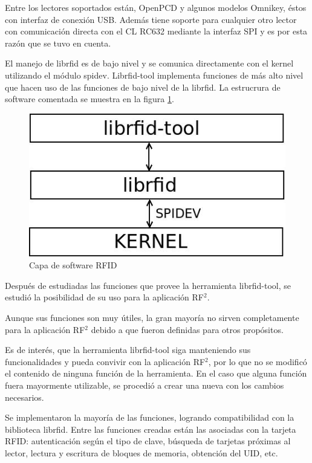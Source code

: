 \documentclass[%
        final,
        notitlepage,
        narroweqnarray,
        inline,
        ]{ieee}
\begin{document}
Entre los lectores soportados están, OpenPCD y algunos modelos Omnikey, éstos con interfaz de conexión USB. Además tiene soporte para cualquier otro lector con comunicación directa con el CL RC632 mediante la interfaz SPI y es por esta razón que se tuvo en cuenta.

El manejo de librfid es de bajo nivel y se comunica directamente con el kernel utilizando el módulo spidev. Librfid-tool implementa funciones de más alto nivel que hacen uso de las funciones de bajo nivel de la librfid. La estrucrura de software comentada se muestra en la figura \ref{sw_RFID}.

\begin{figure}[h]
\centering
  \begin{center}
  \includegraphics[scale=.4]{../docs/Imagenes/librfid-tool.jpg} 
  \end{center}
  \caption{Capa de software RFID}\label{sw_RFID} 
\end{figure}


Después de estudiadas las funciones que provee la herramienta librfid-tool, se estudió la posibilidad de su uso para la aplicación RF$^{2}$. 

Aunque sus funciones  son muy útiles, la gran mayoría no sirven completamente para la aplicación RF$^{2}$ debido a que fueron definidas para otros propósitos. 

Es de interés, que la herramienta librfid-tool siga manteniendo sus funcionalidades y pueda convivir con la aplicación RF$^{2}$, por lo que no se modificó el contenido de ninguna función de la herramienta. En el caso que alguna función fuera mayormente utilizable, se procedió a crear una nueva con los cambios necesarios.

Se implementaron la mayoría de las funciones, logrando compatibilidad con la biblioteca librfid. Entre las funciones creadas están las asociadas con la tarjeta RFID: autenticación según el tipo de clave, búsqueda de tarjetas próximas al lector, lectura y escritura de bloques de memoria, obtención del UID, etc.
\end{document}

